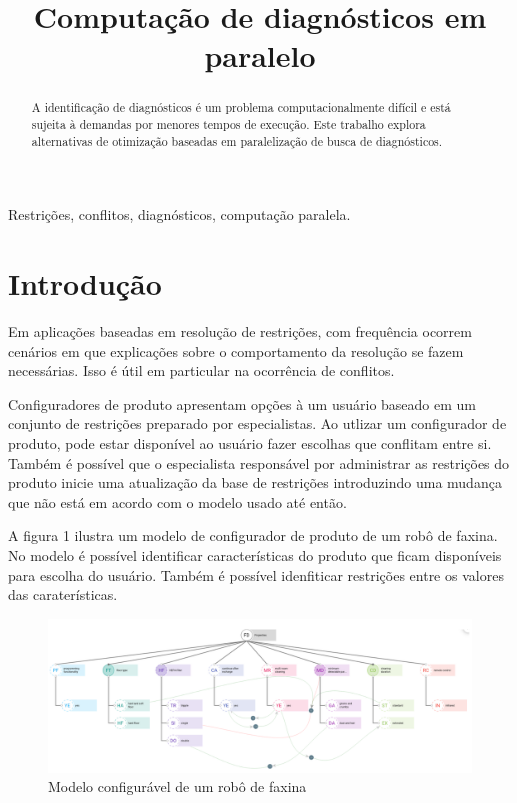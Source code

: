 \documentclass[conference]{IEEEtran}
\begin{document}
\title{Computação de diagnósticos em paralelo\\
}

\author{
}

\maketitle

\begin{abstract}
A identificação de diagnósticos é um problema computacionalmente difícil e está sujeita à demandas por menores tempos de execução. Este trabalho explora alternativas de otimização baseadas em paralelização de busca de diagnósticos.
\end{abstract}

\begin{IEEEkeywords}
Restrições, conflitos, diagnósticos, computação paralela.
\end{IEEEkeywords}

\section{Introdução}

Em aplicações baseadas em resolução de restrições, com frequência ocorrem cenários em que explicações sobre o comportamento da resolução se fazem necessárias. Isso é útil em particular na ocorrência de conflitos.

Configuradores de produto apresentam opções à um usuário baseado em um conjunto de restrições preparado por especialistas. Ao utlizar um configurador de produto, pode estar disponível ao usuário fazer escolhas que conflitam entre si. Também é possível que o especialista responsável por administrar as restrições do produto inicie uma atualização da base de restrições introduzindo uma mudança que não está em acordo com o modelo usado até então.

A figura 1 ilustra um modelo de configurador de produto de um robô de faxina. No modelo é possível identificar características do produto que ficam disponíveis para escolha do usuário. Também é possível idenfiticar restrições entre os valores das caraterísticas.

\begin{figure}[htbp]
\centerline{\includegraphics[width=1\columnwidth]{model.png}}
\caption{Modelo configurável de um robô de faxina} 
\label{fig}
\end{figure}
\end{document}
